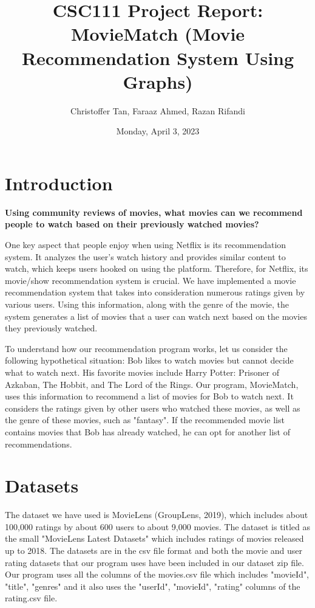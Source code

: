 \documentclass[fontsize=11pt]{article}
\title{CSC111 Project Report: \textbf{MovieMatch} (Movie Recommendation System Using Graphs)}
\author{Christoffer Tan, Faraaz Ahmed, Razan Rifandi}
\date{Monday, April 3, 2023}
\begin{document}
\maketitle

\section*{Introduction}

\textbf{Using community reviews of movies, what movies can we recommend people to watch based on their previously watched movies?}

\quad One key aspect that people enjoy when using Netflix is its recommendation system. It analyzes the user's watch history and provides similar content to watch, which keeps users hooked on using the platform. Therefore, for Netflix, its movie/show recommendation system is crucial. We have implemented a movie recommendation system that takes into consideration numerous ratings given by various users. Using this information, along with the genre of the movie, the system generates a list of movies that a user can watch next based on the movies they previously watched.

\quad To understand how our recommendation program works, let us consider the following hypothetical situation: Bob likes to watch movies but cannot decide what to watch next. His favorite movies include Harry Potter: Prisoner of Azkaban, The Hobbit, and The Lord of the Rings. Our program, MovieMatch, uses this information to recommend a list of movies for Bob to watch next. It considers the ratings given by other users who watched these movies, as well as the genre of these movies, such as "fantasy". If the recommended movie list contains movies that Bob has already watched, he can opt for another list of recommendations. 

\section*{Datasets}

The dataset we have used is MovieLens (GroupLens, 2019), which includes about 100,000 ratings by about 600 users to about 9,000 movies. The dataset is titled as the small "MovieLens Latest Datasets" which includes ratings of movies released up to 2018. The datasets are in the csv file format and both the movie and user rating datasets that our program uses have been included in our dataset zip file. Our program uses all the columns of the movies.csv file which includes "movieId", "title", "genres" and it also uses the "userId", "movieId", "rating" columns of the rating.csv file.
\end{document}
